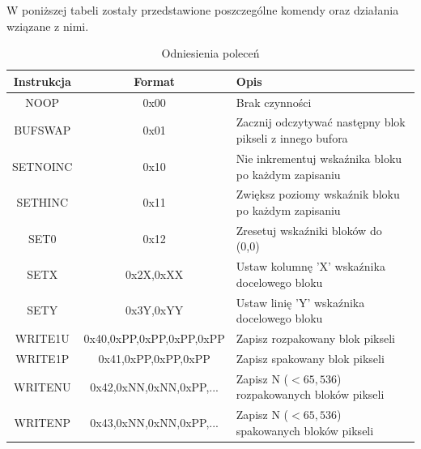 \documentclass[12pt, a4paper]{article}
\begin{document}
W poniższej tabeli zostały przedstawione poszczególne komendy oraz działania wziązane z nimi.
\begin{center}
\begin{table}[h]
\centering
\caption{Odniesienia poleceń}
\begin{tabular}{|c|c|p{6cm}|}
\hline
\textbf{Instrukcja} & \textbf{Format} & \textbf{Opis} \\
\hline
NOOP & 0x00 & Brak czynności \\
\hline
BUFSWAP & 0x01 & Zacznij odczytywać następny blok pikseli z innego bufora \\
\hline
SETNOINC & 0x10 & Nie inkrementuj wskaźnika bloku po każdym zapisaniu \\
\hline
SETHINC & 0x11 & Zwiększ poziomy wskaźnik bloku po każdym zapisaniu \\
\hline
SET0 & 0x12 & Zresetuj wskaźniki bloków do (0,0) \\
\hline
SETX & 0x2X,0xXX & Ustaw kolumnę 'X' wskaźnika docelowego bloku \\
\hline
SETY & 0x3Y,0xYY & Ustaw linię 'Y' wskaźnika docelowego bloku \\
\hline
WRITE1U & 0x40,0xPP,0xPP,0xPP,0xPP & Zapisz rozpakowany blok pikseli \\
\hline
WRITE1P & 0x41,0xPP,0xPP,0xPP & Zapisz spakowany blok pikseli \\
\hline
WRITENU & 0x42,0xNN,0xNN,0xPP,... & Zapisz N ($<65,536$) rozpakowanych bloków pikseli \\
\hline
WRITENP & 0x43,0xNN,0xNN,0xPP,... & Zapisz N ($<65,536$) spakowanych bloków pikseli \\
\hline
\end{tabular}
\end{table}
\end{center}
\newpage
\end{document}
